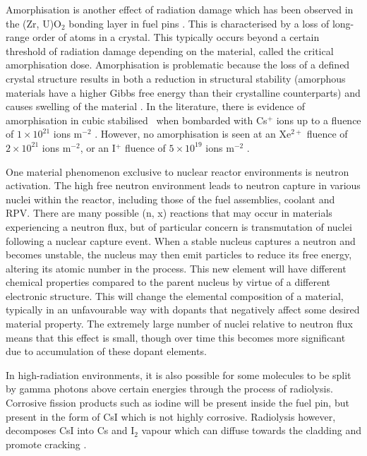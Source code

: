Amorphisation is another effect of radiation damage which has been observed in the (Zr, U)O$_{2}$ bonding layer in fuel pins \cite{Nogita1997}. This is characterised by a loss of long-range order of atoms in a crystal. This typically occurs beyond a certain threshold of radiation damage depending on the material, called the critical amorphisation dose. Amorphisation is problematic because the loss of a defined crystal structure results in both a reduction in structural stability (amorphous materials have a higher Gibbs free energy than their crystalline counterparts) and causes swelling of the material \cite{Einfal2013}. In the literature, there is evidence of amorphisation in cubic stabilised \zirconia\ when bombarded with Cs$^{+}$ ions up to a fluence of $1 \times 10^{21}$ ions m$^{-2}$ \cite{amorphization2000wang}. However, no amorphisation is seen at an Xe$^{2+}$ fluence of $2 \times 10^{21}$ ions m$^{-2}$, or an I$^{+}$ fluence of $5 \times 10^{19}$ ions m$^{-2}$ \cite{sickafus1999radiation}.

One material phenomenon exclusive to nuclear reactor environments is neutron activation. The high free neutron environment leads to neutron capture in various nuclei within the reactor, including those of the fuel assemblies, coolant and RPV. There are many possible (n, x) reactions that may occur in materials experiencing a neutron flux, but of particular concern is transmutation of nuclei following a nuclear capture event. When a stable nucleus captures a neutron and becomes unstable, the nucleus may then emit particles to reduce its free energy, altering its atomic number in the process. This new element will have different chemical properties compared to the parent nucleus by virtue of a different electronic structure. This will change the elemental composition of a material, typically in an unfavourable way with dopants that negatively affect some desired material property. The extremely large number of nuclei relative to neutron flux means that this effect is small, though over time this becomes more significant due to accumulation of these dopant elements.

In high-radiation environments, it is also possible for some molecules to be split by gamma photons above certain energies through the process of radiolysis. Corrosive fission products such as iodine will be present inside the fuel pin, but present in the form of CsI which is not highly corrosive. Radiolysis however, decomposes CsI into Cs and I$_{2}$ vapour which can diffuse towards the cladding and promote cracking \cite{Konashi1983}.

